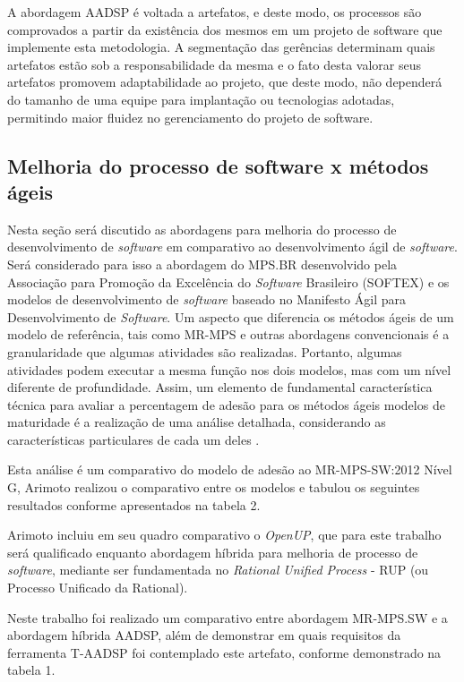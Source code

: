 \documentclass{acm_proc_article-sp}
\begin{document}
A abordagem AADSP é voltada a artefatos, e deste modo, os processos são comprovados a partir da existência dos mesmos em um projeto de software que implemente esta metodologia. A segmentação das gerências determinam quais artefatos estão sob a responsabilidade da mesma e o fato desta valorar seus artefatos promovem adaptabilidade ao projeto, que deste modo, não dependerá do tamanho de uma equipe para implantação ou tecnologias adotadas, permitindo maior fluidez no gerenciamento do projeto de software.

\subsection{Melhoria do processo de software x métodos ágeis}
Nesta seção será discutido as abordagens para melhoria do processo de desenvolvimento de \textit{software} em comparativo ao desenvolvimento ágil de \textit{software}. Será considerado para isso a abordagem do MPS.BR desenvolvido pela Associação para Promoção da Excelência do \textit{Software} Brasileiro (SOFTEX) e os modelos de desenvolvimento de \textit{software} baseado no Manifesto Ágil para Desenvolvimento de \textit{Software}. Um aspecto que diferencia os métodos ágeis de um modelo de referência, tais como MR-MPS e
outras abordagens convencionais é a granularidade que algumas atividades são realizadas. Portanto, algumas atividades podem executar a mesma função nos dois modelos, mas com um nível diferente de profundidade. Assim, um elemento de fundamental
característica técnica para avaliar a percentagem de adesão para os métodos ágeis modelos de maturidade é a realização de uma análise detalhada, considerando as características particulares de cada um deles \cite{Arimoto:melhoria}.  

Esta análise é um comparativo do modelo de adesão ao MR-MPS-SW:2012 Nível G, Arimoto \cite{Arimoto:melhoria} realizou o comparativo entre os modelos e tabulou os seguintes resultados conforme apresentados na tabela 2.


Arimoto \cite{Arimoto:melhoria} incluiu em seu quadro comparativo o \textit{OpenUP}, que para este trabalho será qualificado enquanto abordagem híbrida para melhoria de processo de \textit{software}, mediante ser fundamentada no \textit{Rational Unified Process} - RUP (ou Processo Unificado da Rational).

Neste trabalho foi realizado um comparativo entre abordagem MR-MPS.SW e a abordagem híbrida AADSP, além de demonstrar em quais requisitos da ferramenta T-AADSP foi contemplado este artefato, conforme demonstrado na tabela 1.
\end{document}
